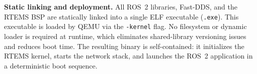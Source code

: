\textbf{Static linking and deployment.}
All ROS~2 libraries, Fast-DDS, and the RTEMS BSP are statically linked into a single ELF executable (\texttt{.exe}).
This executable is loaded by QEMU via the \texttt{-kernel} flag.
No filesystem or dynamic loader is required at runtime, which eliminates shared-library versioning issues and reduces boot time.
The resulting binary is self-contained: it initializes the RTEMS kernel, starts the network stack, and launches the ROS~2 application in a deterministic boot sequence.
